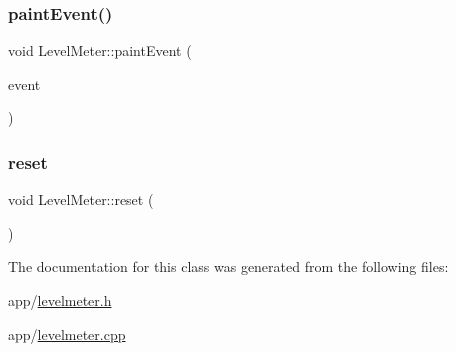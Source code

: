 \hypertarget{class_level_meter_a30abecefda651adad386ab6a643a7295}{}\label{class_level_meter_a30abecefda651adad386ab6a643a7295} 
\subsubsection{\texorpdfstring{paint\+Event()}{paintEvent()}}
{\footnotesize\ttfamily void Level\+Meter\+::paint\+Event (\begin{DoxyParamCaption}\item[{Q\+Paint\+Event $\ast$}]{event }\end{DoxyParamCaption})}

\hypertarget{class_level_meter_a53a108a6b5a8c73198c11d50173c3505}{}\label{class_level_meter_a53a108a6b5a8c73198c11d50173c3505} 
\subsubsection{\texorpdfstring{reset}{reset}}
{\footnotesize\ttfamily void Level\+Meter\+::reset (\begin{DoxyParamCaption}{ }\end{DoxyParamCaption})\hspace{0.3cm}{\ttfamily [slot]}}



The documentation for this class was generated from the following files\+:\begin{DoxyCompactItemize}
\item 
app/\hyperlink{levelmeter_8h}{levelmeter.\+h}\item 
app/\hyperlink{levelmeter_8cpp}{levelmeter.\+cpp}\end{DoxyCompactItemize}
